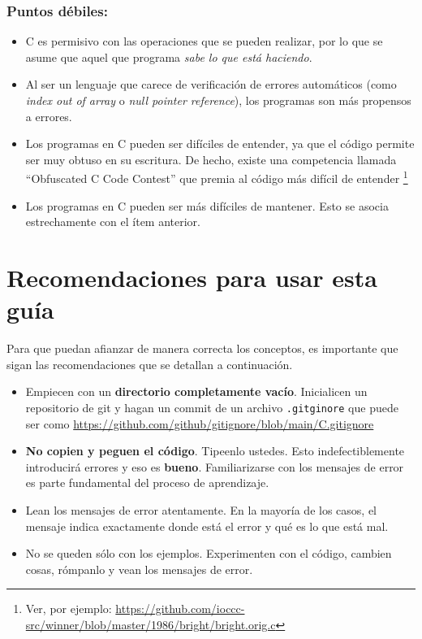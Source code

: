 \documentclass[]{scrartcl}
\begin{document}
\subsubsection*{Puntos débiles:}

\begin{itemize}
\item C es permisivo con las operaciones que se pueden realizar, por lo que se asume que aquel que programa \textit{sabe lo que está haciendo}.
\item Al ser un lenguaje que carece de verificación de errores automáticos (como \textit{index out of array} o \textit{null pointer reference}), los programas son más propensos a errores.
\item Los programas en C pueden ser difíciles de entender, ya que el código permite ser muy obtuso en su escritura. De hecho, existe una competencia llamada ``Obfuscated C Code Contest'' que premia al código más difícil de entender \footnote{Ver, por ejemplo: {\url{https://github.com/ioccc-src/winner/blob/master/1986/bright/bright.orig.c}}}
\item Los programas en C pueden ser más difíciles de mantener. Esto se asocia estrechamente con el ítem anterior.
\end{itemize}

\section*{Recomendaciones para usar esta guía}

Para que puedan afianzar de manera correcta los conceptos, es importante que sigan las recomendaciones que se detallan a continuación.

\begin{itemize}
  \item Empiecen con un \textbf{directorio completamente vacío}. Inicialicen un repositorio de git y hagan un commit de un archivo \texttt{.gitginore} que puede ser como \url{https://github.com/github/gitignore/blob/main/C.gitignore}
  \item \textbf{No copien y peguen el código}. Tipeenlo ustedes. Esto indefectiblemente introducirá errores y eso es \textbf{bueno}. Familiarizarse con los mensajes de error es parte fundamental del proceso de aprendizaje.
  \item Lean los mensajes de error atentamente. En la mayoría de los casos, el mensaje indica exactamente donde está el error y qué es lo que está mal.
  \item No se queden sólo con los ejemplos. Experimenten con el código, cambien cosas, rómpanlo y vean los mensajes de error.
  
\end{itemize}
\end{document}
